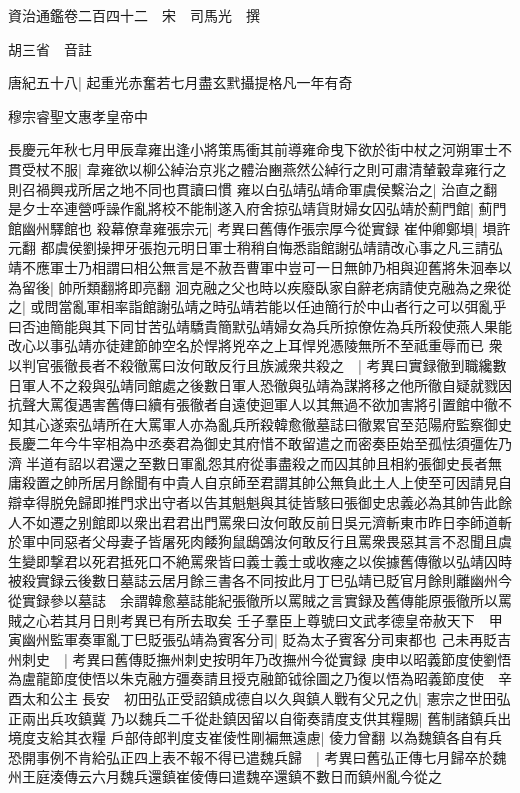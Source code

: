 資治通鑑卷二百四十二　宋　司馬光　撰

胡三省　音註

唐紀五十八|{
	起重光赤奮若七月盡玄黓攝提格凡一年有奇}


穆宗睿聖文惠孝皇帝中

長慶元年秋七月甲辰韋雍出逢小將策馬衝其前導雍命曳下欲於街中杖之河朔軍士不貫受杖不服|{
	韋雍欲以柳公綽治京兆之體治豳燕然公綽行之則可肅清輦轂韋雍行之則召禍興戎所居之地不同也貫讀曰慣}
雍以白弘靖弘靖命軍虞侯繫治之|{
	治直之翻}
是夕士卒連營呼譟作亂將校不能制遂入府舍掠弘靖貨財婦女囚弘靖於薊門館|{
	薊門館幽州驛館也}
殺幕僚韋雍張宗元|{
	考異曰舊傳作張宗厚今從實録}
崔仲卿鄭塤|{
	塤許元翻}
都虞侯劉操押牙張抱元明日軍士稍稍自悔悉詣館謝弘靖請改心事之凡三請弘靖不應軍士乃相謂曰相公無言是不赦吾曹軍中豈可一日無帥乃相與迎舊將朱洄奉以為留後|{
	帥所類翻將即亮翻}
洄克融之父也時以疾廢臥家自辭老病請使克融為之衆從之|{
	或問當亂軍相率詣館謝弘靖之時弘靖若能以任迪簡行於中山者行之可以弭亂乎曰否迪簡能與其下同甘苦弘靖驕貴簡默弘靖婦女為兵所掠僚佐為兵所殺使燕人果能改心以事弘靖亦徒建節帥空名於悍將兇卒之上耳悍兇憑陵無所不至祗重辱而已}
衆以判官張徹長者不殺徹罵曰汝何敢反行且族滅衆共殺之　|{
	考異曰實録徹到職纔數日軍人不之殺與弘靖同館處之後數日軍人恐徹與弘靖為謀將移之他所徹自疑就戮因抗聲大罵復遇害舊傳曰續有張徹者自遠使迴軍人以其無過不欲加害將引置館中徹不知其心遂索弘靖所在大罵軍人亦為亂兵所殺韓愈徹墓誌曰徹累官至范陽府監察御史長慶二年今牛宰相為中丞奏君為御史其府惜不敢留遣之而密奏臣始至孤怯須彊佐乃濟半道有詔以君還之至數日軍亂怨其府從事盡殺之而囚其帥且相約張御史長者無庸殺置之帥所居月餘聞有中貴人自京師至君謂其帥公無負此土人上使至可因請見自辯幸得脱免歸即推門求出守者以告其魁魁與其徒皆駭曰張御史忠義必為其帥告此餘人不如遷之别館即以衆出君君出門罵衆曰汝何敢反前日吳元濟斬東市昨日李師道斬於軍中同惡者父母妻子皆屠死肉餧狗鼠鴟鵶汝何敢反行且罵衆畏惡其言不忍聞且虞生變即撃君以死君抵死口不絶罵衆皆曰義士義士或收瘞之以俟據舊傳徹以弘靖囚時被殺實録云後數日墓誌云居月餘三書各不同按此月丁巳弘靖已貶官月餘則離幽州今從實録參以墓誌　余謂韓愈墓誌能紀張徹所以罵賊之言實録及舊傳能原張徹所以罵賊之心若其月日則考異已有所去取矣}
壬子羣臣上尊號曰文武孝德皇帝赦天下　甲寅幽州監軍奏軍亂丁巳貶張弘靖為賓客分司|{
	貶為太子賓客分司東都也}
己未再貶吉州刺史　|{
	考異曰舊傳貶撫州刺史按明年乃改撫州今從實録}
庚申以昭義節度使劉悟為盧龍節度使悟以朱克融方彊奏請且授克融節钺徐圖之乃復以悟為昭義節度使　辛酉太和公主長安　初田弘正受詔鎮成德自以久與鎮人戰有父兄之仇|{
	憲宗之世田弘正兩出兵攻鎮冀}
乃以魏兵二千從赴鎮因留以自衛奏請度支供其糧賜|{
	舊制諸鎮兵出境度支給其衣糧}
戶部侍郎判度支崔倰性剛褊無遠慮|{
	倰力曾翻}
以為魏鎮各自有兵恐開事例不肯給弘正四上表不報不得已遣魏兵歸　|{
	考異曰舊弘正傳七月歸卒於魏州王庭湊傳云六月魏兵還鎮崔倰傳曰遣魏卒還鎮不數日而鎮州亂今從之}
